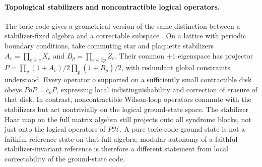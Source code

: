 \documentclass[a4paper,11pt]{article}
\theoremstyle{definition}
\newcommand{\cH}{\mathcal{H}}
\begin{document}
\paragraph{Topological stabilizers and noncontractible logical operators.}
The toric code gives a geometrical version of the same distinction
between a stabilizer-fixed algebra and a correctable subspace
\cite{Kitaev2003}. On a lattice with periodic boundary conditions,
take commuting star and plaquette stabilizers
$A_v=\prod_{e\ni v}X_e$ and $B_p=\prod_{e\in\partial p}Z_e$.
Their common $+1$ eigenspace has projector
$P=\prod_v(1+A_v)/2\prod_p(1+B_p)/2$, with redundant global
constraints understood. Every operator $o$ supported on a sufficiently
small contractible disk obeys $PoP=c_oP$, expressing local
indistinguishability and correction of erasure of that disk. In contrast,
noncontractible Wilson-loop operators commute with the stabilizers but
act nontrivially on the logical ground-state space. The stabilizer Haar
map on the full matrix algebra still projects onto all syndrome blocks,
not just onto the logical operators of $P\cH$. A pure toric-code ground
state is not a faithful reference state on that full algebra; modular
autonomy of a faithful stabilizer-invariant reference is therefore a
different statement from local correctability of the ground-state code.
\end{document}
